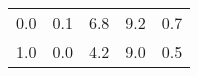 \begin{tabular}{ccccc}
\hline
0.0 & 0.1 & 6.8 & 9.2 & 0.7 \\
1.0 & 0.0 & 4.2 & 9.0 & 0.5 \\
\hline
\end{tabular}
